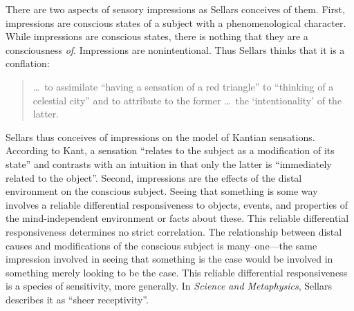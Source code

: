 \documentclass[12pt]{article}
\begin{document}
There are two aspects of sensory impressions as Sellars conceives of them. First, impressions are conscious states of a subject with a phenomenological character. While impressions are conscious states, there is nothing that they are a consciousness \emph{of}. Impressions are nonintentional. Thus Sellars thinks that it is a conflation:
\begin{quote}
    \ldots\ to assimilate ``having a sensation of a red triangle'' to ``thinking of a celestial city'' and to attribute to the former \ldots\ the `intentionality' of the latter.
\end{quote}
Sellars thus conceives of impressions on the model of Kantian sensations. According to Kant, a sensation ``relates to the subject as a modification of its state'' and contrasts with  an intuition in that only the latter is ``immediately related to the object''. Second, impressions are the effects of the distal environment on the conscious subject. Seeing that something is some way involves a reliable differential responsiveness to objects, events, and properties of the mind-independent environment or facts about these. This reliable differential responsiveness determines no strict correlation. The relationship between distal causes and modifications of the conscious subject is many--one---the same impression involved in seeing that something is the case would be involved in something merely looking to be the case. This reliable differential responsiveness is a species of sensitivity, more generally. In \emph{Science and Metaphysics}, Sellars describes it as ``sheer receptivity''.
\end{document}
